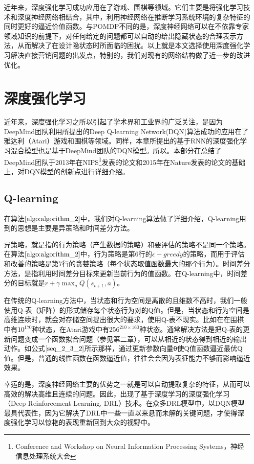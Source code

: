 近年来，深度强化学习成功应用在了游戏、围棋等领域。它们主要是将强化学习技术和深度神经网络相结合，其中，利用神经网络在推断学习系统环境的复杂特征的同时更好的逼近价值函数。与POMDP不同的是，深度神经网络可以在不依靠专家领域知识的前提下，对任何给定的问题都可以自动的给出隐藏状态的合理表示方法\citep{deng2014deep}，从而解决了在设计隐状态时所面临的困扰。以上就是本文选择使用深度强化学习解决直接营销问题的出发点，特别的，我们对现有的网络结构做了近一步的改进优化。

\section{深度强化学习}
近年来，深度强化学习之所以引起了学术界和工业界的广泛关注，是因为DeepMind团队利用所提出的Deep Q-learning Network(DQN)算法成功的应用在了雅达利（Atari）游戏和围棋等领域。同样，本章所提出的基于RNN的深度强化学习混合模型也是基于DeepMind团队的DQN模型。所以。本部分在总结了DeepMind团队于2013年在NIPS\footnote{Conference and Workshop on Neural Information Processing Systems，神经信息处理系统大会}发表的论文\citep{mnih2013playing}和2015年在Nature发表的论文\citep{mnih2015human}的基础上，对DQN模型的创新点进行详细介绍。

\subsection{Q-learning}
在算法$\ref{algo:algorithm_2}$中，我们对Q-learning算法做了详细介绍，Q-learning用到的思想是主要是异策略和时间差分方法。

异策略，就是指的行为策略（产生数据的策略）和要评估的策略不是同一个策略。在算法$\ref{algo:algorithm_2}$中，行为策略是第6行的$\epsilon-greedy$的策略，而用于评估和改善的策略是第7行的贪婪策略（每个状态取值函数最大的那个行为）。时间差分方法，是指利用时间差分目标来更新当前行为的值函数。在Q-learning中，时间差分的目标就是$r+\gamma \max_{a} Q(s_{t+1},a)$。

在传统的Q-learning方法中，当状态和行为空间是离散的且维数不高时，我们一般使用Q-表（矩阵）的形式储存每个状态行为对的Q值。但是，当状态和行为空间是高维连续时，就会对存储空间提出很大的要求，使用Q-表不现实。比如在在围棋中有$10^{170}$种状态，在Atari游戏中有$256^{210\times160}$种状态。通常解决方法是把Q-表的更新问题变成一个函数拟合问题（参见第二章），可以从相近的状态得到相近的输出动作。如公式$\eqref{seq_2_3_2}$所示那样，通过更新参数向量$\mathbf{\theta}$使Q值函数逼近最优Q值。但是，普通的线性函数在函数逼近值，往往会会因为表征能力不够而影响逼近效果。

幸运的是，深度神经网络主要的优势之一就是可以自动提取复杂的特征，从而可以高效的解决高维且连续的问题。因此，出现了基于深度学习的深度强化学习（Deep Reinforcement Learning, DRL）技术。在众多DRL模型中，以DQN模型最具代表性，因为它解决了DRL中一些一直以来悬而未解的关键问题，才使得深度强化学习以惊艳的表现重新回到大众的视野中。

